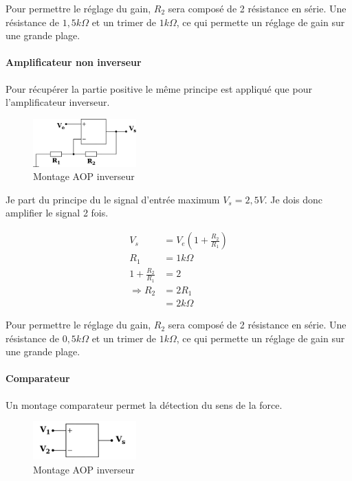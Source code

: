 \documentclass[11pt]{article}
\begin{document}
Pour permettre le réglage du gain, $R_{2}$ sera composé de 2 résistance en série. Une résistance de $1,5k\Omega$ et un trimer de $1k\Omega$, ce qui permette un réglage de gain sur une grande plage.

\paragraph{Amplificateur non inverseur}

Pour récupérer la partie positive le même principe est appliqué que pour l'amplificateur inverseur.

\begin{figure}[!h]
	\centering
	\includegraphics[width=150px]{AOP_amp.png}
	\caption{Montage AOP inverseur}
\end{figure}
\FloatBarrier

Je part du principe du le signal d'entrée maximum $V_{s} = 2,5V$. Je dois donc amplifier le signal 2 fois.

\begin{equation}
	 \begin{split}
		V_{s} &= V_{e} (1+\frac{R_{2}}{R_{1}})\\
		R_{1} &= 1k\Omega\\
		1+\frac{R_{2}}{R_{1}} &= 2\\
		\Rightarrow R_{2} &= 2 R_{1}\\
		&= 2k\Omega
	\end{split}
\end{equation}

Pour permettre le réglage du gain, $R_{2}$ sera composé de 2 résistance en série. Une résistance de $0,5k\Omega$ et un trimer de $1k\Omega$, ce qui permette un réglage de gain sur une grande plage.

\paragraph{Comparateur}

Un montage comparateur permet la détection du sens de la force. 

\begin{figure}[!h]
	\centering
	\includegraphics[width=150px]{AOP_comp.png}
	\caption{Montage AOP inverseur}
\end{figure}
\FloatBarrier
\end{document}
